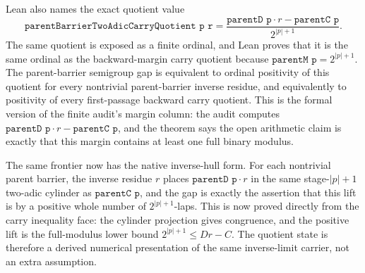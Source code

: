 \begin{theorem}
  \label{thm:collatz-two-adic-carry-quotient-positive}
  \leanok
  Lean also names the exact quotient value
  \[
    \texttt{parentBarrierTwoAdicCarryQuotient p r}
      = \frac{\texttt{parentD p}\cdot r-\texttt{parentC p}}{2^{|p|+1}} .
  \]
  The same quotient is exposed as a finite ordinal, and Lean proves that it is
  the same ordinal as the backward-margin carry quotient because
  \(\texttt{parentM p}=2^{|p|+1}\). The parent-barrier semigroup gap is equivalent
  to ordinal positivity of this quotient for every nontrivial parent-barrier
  inverse residue, and equivalently to positivity of every first-passage backward
  carry quotient. This is the formal version of the finite audit's margin column:
  the audit computes
  \(\texttt{parentD p}\cdot r-\texttt{parentC p}\), and the theorem says
  the open arithmetic claim is exactly that this margin contains at least one
  full binary modulus.
\end{theorem}
\begin{theorem}
  \label{thm:collatz-two-adic-cylinder-lift-gap}
  \leanok
  The same frontier now has the native inverse-hull form. For each nontrivial
  parent barrier, the inverse residue \(r\) places
  \(\texttt{parentD p}\cdot r\) in the same stage-\(|p|+1\) two-adic cylinder as
  \(\texttt{parentC p}\), and the gap is exactly the assertion that this lift is
  by a positive whole number of \(2^{|p|+1}\)-laps. This is now proved directly
  from the carry inequality face: the cylinder projection gives congruence, and
  the positive lift is the full-modulus lower bound \(2^{|p|+1}\le D r-C\).
  The quotient state is therefore a derived numerical presentation of the same
  inverse-limit carrier, not an extra assumption.
\end{theorem}
